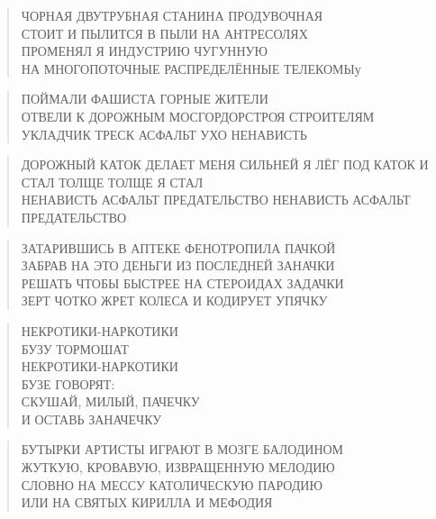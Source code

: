 \poemtitle{***}
\begin{verse}
ЧОРНАЯ ДВУТРУБНАЯ СТАНИНА ПРОДУВОЧНАЯ\\
СТОИТ И ПЫЛИТСЯ В ПЫЛИ НА АНТРЕСОЛЯХ\\
ПРОМЕНЯЛ Я ИНДУСТРИЮ ЧУГУННУЮ\\
НА МНОГОПОТОЧНЫЕ РАСПРЕДЕЛЁННЫЕ ТЕЛЕКОМЫу
\end{verse}

\poemtitle{***}
\begin{verse}
ПОЙМАЛИ ФАШИСТА ГОРНЫЕ ЖИТЕЛИ\\
ОТВЕЛИ К ДОРОЖНЫМ МОСГОРДОРСТРОЯ СТРОИТЕЛЯМ\\
УКЛАДЧИК ТРЕСК АСФАЛЬТ УХО НЕНАВИСТЬ
\end{verse}

\poemtitle{***}
\begin{verse}
ДОРОЖНЫЙ КАТОК ДЕЛАЕТ МЕНЯ СИЛЬНЕЙ Я ЛЁГ ПОД КАТОК И СТАЛ ТОЛЩЕ ТОЛЩЕ Я СТАЛ\\
НЕНАВИСТЬ АСФАЛЬТ ПРЕДАТЕЛЬСТВО НЕНАВИСТЬ АСФАЛЬТ ПРЕДАТЕЛЬСТВО
\end{verse}

\poemtitle{***}
\begin{verse}
ЗАТАРИВШИСЬ В АПТЕКЕ ФЕНОТРОПИЛА ПАЧКОЙ\\
ЗАБРАВ НА ЭТО ДЕНЬГИ ИЗ ПОСЛЕДНЕЙ ЗАНАЧКИ\\
РЕШАТЬ ЧТОБЫ БЫСТРЕЕ НА СТЕРОИДАХ ЗАДАЧКИ\\
ЗЕРТ ЧОТКО ЖРЕТ КОЛЕСА И КОДИРУЕТ УПЯЧКУ
\end{verse}

\poemtitle{***}
\begin{verse}
НЕКРОТИКИ-НАРКОТИКИ\\
БУЗУ ТОРМОШАТ\\
НЕКРОТИКИ-НАРКОТИКИ\\
БУЗЕ ГОВОРЯТ:\\
СКУШАЙ, МИЛЫЙ, ПАЧЕЧКУ\\
И ОСТАВЬ ЗАНАЧЕЧКУ
\end{verse}

\poemtitle{***}
\begin{verse}
БУТЫРКИ АРТИСТЫ ИГРАЮТ В МОЗГЕ БАЛОДИНОМ\\
ЖУТКУЮ, КРОВАВУЮ, ИЗВРАЩЕННУЮ МЕЛОДИЮ\\
СЛОВНО НА МЕССУ КАТОЛИЧЕСКУЮ ПАРОДИЮ\\
ИЛИ НА СВЯТЫХ КИРИЛЛА И МЕФОДИЯ
\end{verse}

